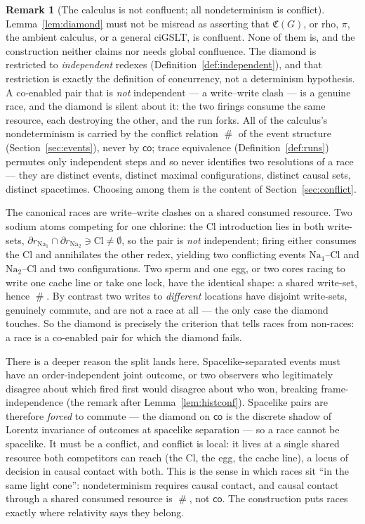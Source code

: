 \documentclass[11pt]{article}
\theoremstyle{definition}
\newtheorem{remark}[definition]{Remark}
\theoremstyle{plain}
\newcommand{\Cost}{\mathfrak{C}}
\newcommand{\foot}{\partial}                       %
\newcommand{\co}{\mathbin{\mathsf{co}}}            %
\newcommand{\confl}{\mathrel{\#}}                  %
\theoremstyle{remark}
\begin{document}
\begin{remark}[The calculus is not confluent; all nondeterminism is conflict]
\label{rem:nonconfluent}
Lemma~\ref{lem:diamond} must not be misread as asserting that $\Cost(G)$,
or rho, $\pi$, the ambient calculus, or a general ciGSLT, is confluent.
None of them is, and the construction neither claims nor needs global
confluence. The diamond is restricted to \emph{independent} redexes
(Definition~\ref{def:independent}), and that restriction is exactly the
definition of concurrency, not a determinism hypothesis. A co-enabled
pair that is \emph{not} independent --- a write--write clash --- is a
genuine race, and the diamond is silent about it: the two firings consume
the same resource, each destroying the other, and the run forks. All of
the calculus's nondeterminism is carried by the conflict relation
$\confl$ of the event structure (Section~\ref{sec:events}), never by
$\co$; trace equivalence (Definition~\ref{def:runs}) permutes only
independent steps and so never identifies two resolutions of a race ---
they are distinct events, distinct maximal configurations, distinct
causal sets, distinct spacetimes. Choosing among them is the content of
Section~\ref{sec:conflict}.

The canonical races are write--write clashes on a shared consumed
resource. Two sodium atoms competing for one chlorine: the Cl
introduction lies in both write-sets, $\foot r_{\mathrm{Na}_1} \cap
\foot r_{\mathrm{Na}_2} \ni \mathrm{Cl} \neq \emptyset$, so the pair is
\emph{not} independent; firing either consumes the Cl and annihilates the
other redex, yielding two conflicting events $\mathrm{Na}_1\text{--}
\mathrm{Cl}$ and $\mathrm{Na}_2\text{--}\mathrm{Cl}$ and two
configurations. Two sperm and one egg, or two cores racing to write one
cache line or take one lock, have the identical shape: a shared
write-set, hence $\confl$. By contrast two writes to \emph{different}
locations have disjoint write-sets, genuinely commute, and are not a race
at all --- the only case the diamond touches. So the diamond is precisely
the criterion that tells races from non-races: a race is a co-enabled
pair for which the diamond fails.

There is a deeper reason the split lands here. Spacelike-separated events
must have an order-independent joint outcome, or two observers who
legitimately disagree about which fired first would disagree about who
won, breaking frame-independence (the remark after
Lemma~\ref{lem:histconf}). Spacelike pairs are therefore \emph{forced} to
commute --- the diamond on $\co$ is the discrete shadow of Lorentz
invariance of outcomes at spacelike separation --- so a race cannot be
spacelike. It must be a conflict, and conflict is local: it lives at a
single shared resource both competitors can reach (the Cl, the egg, the
cache line), a locus of decision in causal contact with both. This is the
sense in which races sit ``in the same light cone'': nondeterminism
requires causal contact, and causal contact through a shared consumed
resource is $\confl$, not $\co$. The construction puts races exactly where
relativity says they belong.


\end{remark}
\end{document}
